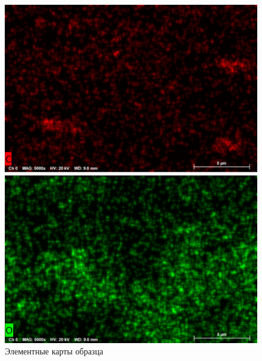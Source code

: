 \documentclass[a4paper,12pt]{article} %
\begin{document}
\begin{figure}[h]
\begin{minipage}{0.49\textwidth}
\vspace{-2em}
\end{minipage}
\begin{minipage}{0.49\textwidth}
\vspace{0.5em}
\includegraphics[width=\textwidth]{spectrum_c.png}
\vspace{-2em}
\end{minipage}
\begin{minipage}{0.49\textwidth}
\vspace{0.5em}
\includegraphics[width=\textwidth]{spectrum_o.png}
\vspace{-2em}
\end{minipage}

\caption{Элементные карты образца}
\label{fig:comp}
\end{figure}
\end{document}
